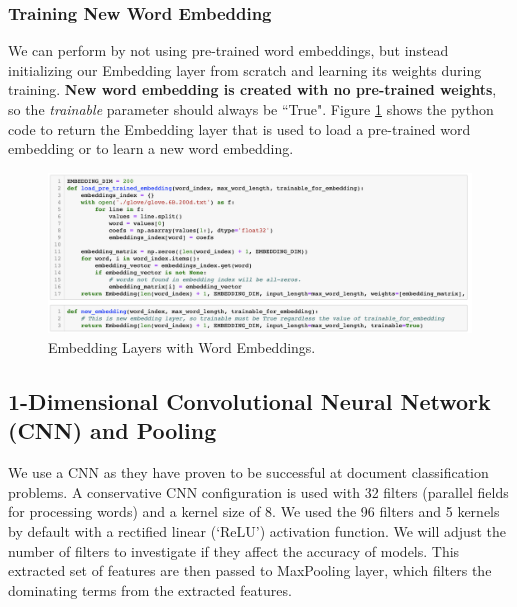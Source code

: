 \documentclass[11pt]{article}
\begin{document}
\subsubsection{Training New Word Embedding}

We can perform by not using pre-trained word embeddings, but instead initializing our Embedding layer from scratch and learning its weights during training. 
%
\textbf{New word embedding is created with no pre-trained weights}, so the \textit{trainable} parameter should always be ``True".
Figure \ref{fig:word_embedding_code} shows the python code to return the Embedding layer that is used 
to load a pre-trained word embedding or 
to learn a new word embedding.
 
\begin{figure}[h!]
\centering 
\includegraphics[width=\textwidth]{word_embedding_code.png}
\caption{Embedding Layers with Word Embeddings.}
  \label{fig:word_embedding_code}
\end{figure}


\subsection{1-Dimensional Convolutional Neural Network (CNN) and Pooling}

We use a CNN as they have proven to be successful at document classification problems.
A conservative CNN configuration is used with 32 filters (parallel fields for processing words) and a kernel size of 8.
We used the 96 filters and 5 kernels by default
with a rectified linear (`ReLU') activation function.
%
We will adjust the number of filters to investigate if they affect the accuracy of models.
%
This extracted set of features are then passed to MaxPooling layer, which filters the dominating terms from the extracted features.
\end{document}
